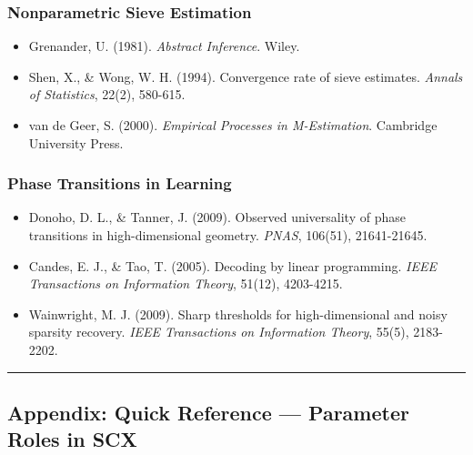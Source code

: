 \documentclass[
  12pt,
]{article}
\providecommand{\tightlist}{%
  \setlength{\itemsep}{0pt}\setlength{\parskip}{0pt}}
\begin{document}
\subsubsection{Nonparametric Sieve
Estimation}\label{nonparametric-sieve-estimation}

\begin{itemize}
\tightlist
\item
  Grenander, U. (1981). \emph{Abstract Inference}. Wiley.
\item
  Shen, X., \& Wong, W. H. (1994). Convergence rate of sieve estimates.
  \emph{Annals of Statistics}, 22(2), 580-615.
\item
  van de Geer, S. (2000). \emph{Empirical Processes in M-Estimation}.
  Cambridge University Press.
\end{itemize}

\subsubsection{Phase Transitions in
Learning}\label{phase-transitions-in-learning}

\begin{itemize}
\tightlist
\item
  Donoho, D. L., \& Tanner, J. (2009). Observed universality of phase
  transitions in high-dimensional geometry. \emph{PNAS}, 106(51),
  21641-21645.
\item
  Candes, E. J., \& Tao, T. (2005). Decoding by linear programming.
  \emph{IEEE Transactions on Information Theory}, 51(12), 4203-4215.
\item
  Wainwright, M. J. (2009). Sharp thresholds for high-dimensional and
  noisy sparsity recovery. \emph{IEEE Transactions on Information
  Theory}, 55(5), 2183-2202.
\end{itemize}

\begin{center}\rule{0.5\linewidth}{0.5pt}\end{center}

\subsection{Appendix: Quick Reference --- Parameter Roles in
SCX}\label{appendix-quick-reference-parameter-roles-in-scx}
\end{document}
